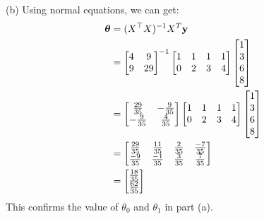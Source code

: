 \documentclass[12pt,letterpaper]{hmcpset}
\begin{document}
\begin{solution}
(b) Using normal equations, we can get:
\begin{align*}
\hbox{\boldmath$\theta$} & = (X^\top X)^{-1}X^{T}\textbf{y}\\
& = \begin{bmatrix}
4&9\\
9&29
\end{bmatrix}^{-1}\begin{bmatrix}
1&1&1&1\\
0&2&3&4
\end{bmatrix}\begin{bmatrix}
1\\3\\6\\8
\end{bmatrix}\\
& = \begin{bmatrix}
\frac{29}{35} & -\frac{9}{35}\\
-\frac{9}{35} & \frac{4}{35}
\end{bmatrix}\begin{bmatrix}
1&1&1&1\\
0&2&3&4
\end{bmatrix}\begin{bmatrix}
1\\3\\6\\8
\end{bmatrix}\\
& = \begin{bmatrix}
\frac{29}{35} & \frac{11}{35} & \frac{2}{35} & \frac{-7}{35} \\
\frac{-9}{35} & \frac{-1}{35} & \frac{3}{35} & \frac{7}{35}
\end{bmatrix}\\
& = \begin{bmatrix}
\frac{18}{35}\\
\frac{62}{35}
\end{bmatrix}
\end{align*}
This confirms the value of $\theta_0$ and $\theta_1$ in part (a).


\end{solution}
\end{document}
